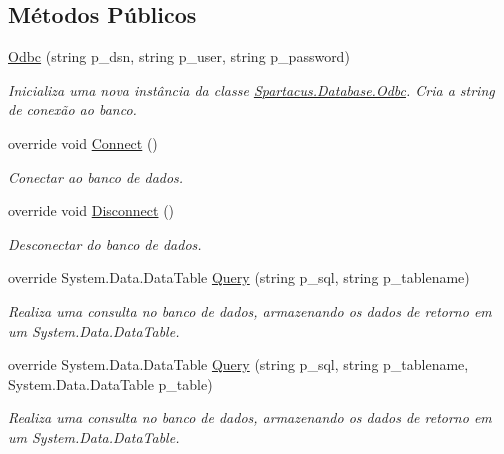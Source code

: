 \subsection*{Métodos Públicos}
\begin{DoxyCompactItemize}
\item 
\hyperlink{classSpartacus_1_1Database_1_1Odbc_a2ea31921d3a0d8e25b73a05e89784bdc}{Odbc} (string p\+\_\+dsn, string p\+\_\+user, string p\+\_\+password)
\begin{DoxyCompactList}\small\item\em Inicializa uma nova instância da classe \hyperlink{classSpartacus_1_1Database_1_1Odbc}{Spartacus.\+Database.\+Odbc}. Cria a string de conexão ao banco. \end{DoxyCompactList}\item 
override void \hyperlink{classSpartacus_1_1Database_1_1Odbc_a306058e9deb3a18bfdb228488a5d7641}{Connect} ()
\begin{DoxyCompactList}\small\item\em Conectar ao banco de dados. \end{DoxyCompactList}\item 
override void \hyperlink{classSpartacus_1_1Database_1_1Odbc_a7b2a59398269853f6ad7f3af308afadf}{Disconnect} ()
\begin{DoxyCompactList}\small\item\em Desconectar do banco de dados. \end{DoxyCompactList}\item 
override System.\+Data.\+Data\+Table \hyperlink{classSpartacus_1_1Database_1_1Odbc_a2332e648d04783ce92a9680f6cd69411}{Query} (string p\+\_\+sql, string p\+\_\+tablename)
\begin{DoxyCompactList}\small\item\em Realiza uma consulta no banco de dados, armazenando os dados de retorno em um System.\+Data.\+Data\+Table. \end{DoxyCompactList}\item 
override System.\+Data.\+Data\+Table \hyperlink{classSpartacus_1_1Database_1_1Odbc_a7b6d07dad45f3124d081976d2b51ed4b}{Query} (string p\+\_\+sql, string p\+\_\+tablename, System.\+Data.\+Data\+Table p\+\_\+table)
\begin{DoxyCompactList}\small\item\em Realiza uma consulta no banco de dados, armazenando os dados de retorno em um System.\+Data.\+Data\+Table. \end{DoxyCompactList}\item 

\end{DoxyCompactItemize}
